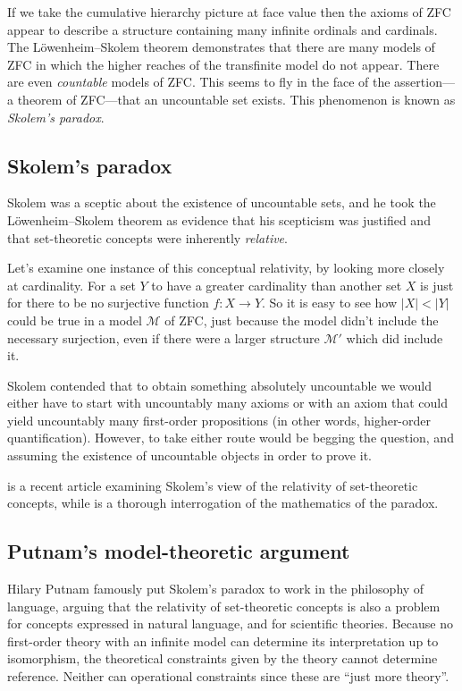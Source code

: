 \documentclass[10pt, a4paper, oneside]{article}
\theoremstyle{definition}
\theoremstyle{remark}
\theoremstyle{plain}
\theoremstyle{plain}
\begin{document}
If we take the cumulative hierarchy picture at face value then the axioms of ZFC
appear to describe a structure containing many infinite ordinals and cardinals.
The Löwenheim--Skolem theorem demonstrates that there are many models of ZFC in
which the higher reaches of the transfinite model do not appear. There are even
\emph{countable} models of ZFC. This seems to fly in the face of the
assertion---a theorem of ZFC---that an uncountable set exists. This phenomenon
is known as \emph{Skolem's paradox}.

\subsection{Skolem's paradox}

Skolem was a sceptic about the existence of uncountable sets, and he took the
Löwenheim--Skolem theorem as evidence that his scepticism was justified and
that set-theoretic concepts were inherently \emph{relative}.

Let's examine one instance of this conceptual relativity, by looking more
closely at cardinality. For a set $Y$ to have a greater cardinality than another
set $X$ is just for there to be no surjective function $f : X \rightarrow Y$. So
it is easy to see how $|X| < |Y|$ could be true in a model $\mathcal{M}$ of ZFC,
just because the model didn't include the necessary surjection, even if there
were a larger structure $\mathcal{M'}$ which did include it.

Skolem contended that to obtain something absolutely uncountable we would either
have to start with uncountably many axioms or with an axiom that could yield
uncountably many first-order propositions (in other words, higher-order
quantification). However, to take either route would be begging the question,
and assuming the existence of uncountable objects in order to prove it.

\citet{jane2001} is a recent article examining Skolem's view of the relativity
of set-theoretic concepts, while \citet{bays2007} is a thorough interrogation of
the mathematics of the paradox.

\subsection{Putnam's model-theoretic argument}

Hilary Putnam \citeyearpar{putnam1980} famously put Skolem's paradox to work in
the philosophy of language, arguing that the relativity of set-theoretic
concepts is also a problem for concepts expressed in natural language, and for
scientific theories. Because no first-order theory with an infinite model can
determine its interpretation up to isomorphism, the theoretical constraints
given by the theory cannot determine reference. Neither can operational
constraints since these are ``just more theory''.
\end{document}
